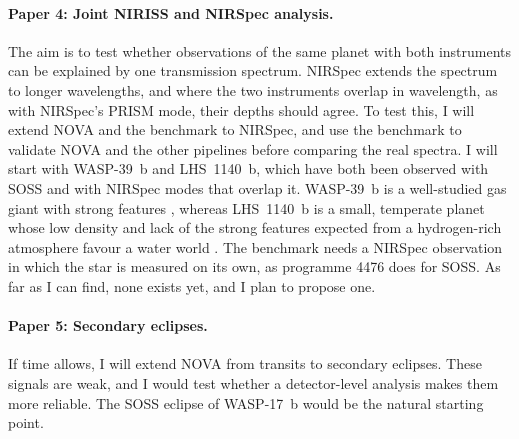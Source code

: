 \paragraph{Paper 4: Joint NIRISS and NIRSpec analysis.} The aim is to test
whether observations of the same planet with both instruments can be explained
by one transmission spectrum. NIRSpec extends the spectrum to longer
wavelengths, and where the two instruments overlap in wavelength, as with
NIRSpec's PRISM mode, their depths should agree. To test this, I will extend
NOVA and the benchmark to NIRSpec, and use the benchmark to validate NOVA and the other pipelines before comparing the real spectra. I will start with WASP-39~b and LHS~1140~b, which
have both been observed with SOSS and with NIRSpec modes that overlap it.
WASP-39~b is a well-studied gas giant with strong features \citep{CarterEtAl2024}, whereas LHS~1140~b is a small, temperate planet whose low density and lack of the strong features expected from a hydrogen-rich atmosphere favour a water world \citep{DamianoEtAl2024}. The benchmark needs a NIRSpec observation in which the
star is measured on its own, as programme 4476 does for SOSS. As far as I can
find, none exists yet, and I plan to propose one.

\paragraph{Paper 5: Secondary eclipses.} If time allows, I will extend NOVA
from transits to secondary eclipses. These signals are weak, and I would test whether a detector-level analysis makes them more reliable. The SOSS eclipse of WASP-17~b \citep{GressierEtAl2024} would be the
natural starting point.


